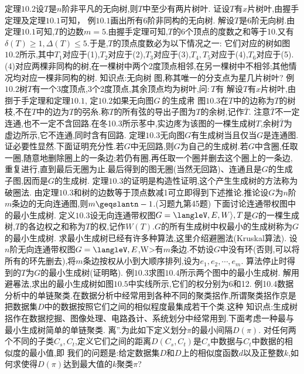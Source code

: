 定理$10.2$设$T$是$n$阶非平凡的无向树,则$T$中至少有两片树叶.
证设$T$有$x$片树叶,由握手定理及定理$10.1$可知，
例$10.1$画出所有6阶非同构的无向树.
解设$T$是6阶无向树.由定理$10.1$可知,$T$的边数$m=5$.由握手定理可知,$T$的6个顶点的度数之和等于10.又有$\delta(T)\geqslant1,\Delta(T)\leqslant5$.于是,$T$的顶点度数必为以下情况之一:
它们对应的树如图$10.2$所示,其中$T_{1}$对应于(1),$T_{2}$对应于(2),$T_{3}$对应于(3),$T_{4},T_{5}$对应于(4),$T_{6}$对应于(5).(4)对应两棵非同构的树,在一棵树中两个2度顶点相邻,在另一棵树中不相邻;其他情况均对应一棵非同构的树.
知识点:无向树
图,称其唯一的分支点为星几片树叶?
例$10.2$树$T$有一个3度顶点,3个2度顶点,其余顶点均为树叶,问$:T$有
解设$T$有$x$片树叶,由捯于手定理和定理$10.1$,
定$10.2$如果无向图$G\mathrm{~的生成帇}$
图$10.3$在$T$中的边称为$T$的树枝,不在$T$中的边为$T$的弜糸.称$T$的所有弦的导出子图为$T$的余树,记作$\bar{T}$.
注意$\bar{T}$不一定连通,也不一定不含回路.在冬10.3所示苳中,实边庝为该图的一棵生成树$T$,余树$\bar{T}$为虚边所示,它不连通,同时含有回路.
定理$10.3$无向图$G$有生成树当且仅当$G$是连通图.
证必要性显然.下面证明充分性.若$G$中无回路,则$G$为自己的生成树.若$G$中含圈,任取一圈,随意地删除圈上的一条边;若仍有圈,再任取一个圈并删去这个圈上的一条边,重复进行,直到最后无圈为止.最后得到的图无圈(当然无回路)、连通且是$G$的生成子图,因而是$G$的生成树.
定理$10.3$的证明是构造性证明,这个产生生成树的方法称为破圈法.
由定理$10.3$和树的边数等于顶点数减1可立即得到下述推论.推论设$G$为$n$阶$m$条边的无向连通图,则$m\geqslantn-1$.(习题九第45题)
下面讨论连通带权图中的最小生成树.
定义$10.3$设无向连通带权图$G=\langleV,E,W\rangle,T$是$G$的一棵生成树,$T$的各边权之和称为$T$的权,记作$W(T).G$的所有生成树中权最小的生成树称为$G$的最小生成树.
求最小生成树已经有许多种算法,这里介绍避圈法(Kruskal算法).
设$n$阶无向连通带权图$G=\langleV,E$,W>有$m$条边.不妨设$G$中没有环(否则,可以将所有的环先删去),将$m$条边按权从小到大顺序排列,设为$e_{1},e_{2},\cdots,e_{m}$.
算法停止时得到的$T$为$G$的最小生成树(证明略).
例$10.3$求图$10.4$所示两个图中的最小生成树.
解用避㒽法,求出的最小生成树如图$10.5$中实线所示,它们的权分别为6和12.
例10.4数据分析中的单链聚类.在数据分析中经常用到各种不同的聚类捛作,所谓聚类捛作京是把数据集$D$中的数据按照它们之间的相似程度最集成若干个类.这种
知识点:生成树捛作在数据挖掘、图像处理、电路叒计、系统划分中经常用到.下面考虑一种最与最小生成树简单的单链聚类.
离”.为此如下定义划分$\pi$的最小间隔$D(\pi)$.
对任何两个不同的子类$C_{s},C_{t}$,定义它们之间的距离$D\left(C_{s},C_{t}\right)$是$C_{s}$中数据与$C_{t}$中数据的相似度的最小值,即
我们的问题是:给定数据集$D$和$D$上的相似度函数$d$以及正整数$k$,如何求使得$D(\pi)$达到最大值的$k$聚类$\pi$?
